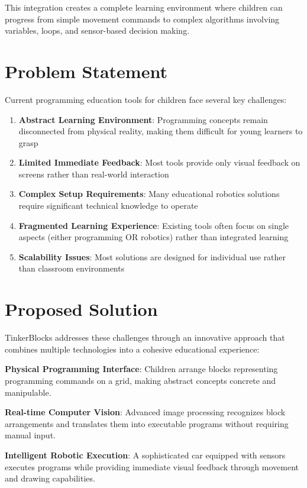 This integration creates a complete learning environment where children can progress from simple movement commands to complex algorithms involving variables, loops, and sensor-based decision making.

\section{Problem Statement}

Current programming education tools for children face several key challenges:

\begin{enumerate}
    \item \textbf{Abstract Learning Environment}: Programming concepts remain disconnected from physical reality, making them difficult for young learners to grasp
    \item \textbf{Limited Immediate Feedback}: Most tools provide only visual feedback on screens rather than real-world interaction
    \item \textbf{Complex Setup Requirements}: Many educational robotics solutions require significant technical knowledge to operate
    \item \textbf{Fragmented Learning Experience}: Existing tools often focus on single aspects (either programming OR robotics) rather than integrated learning
    \item \textbf{Scalability Issues}: Most solutions are designed for individual use rather than classroom environments
\end{enumerate}

\section{Proposed Solution}

TinkerBlocks addresses these challenges through an innovative approach that combines multiple technologies into a cohesive educational experience:

\textbf{Physical Programming Interface}: Children arrange blocks representing programming commands on a grid, making abstract concepts concrete and manipulable.

\textbf{Real-time Computer Vision}: Advanced image processing recognizes block arrangements and translates them into executable programs without requiring manual input.

\textbf{Intelligent Robotic Execution}: A sophisticated car equipped with sensors executes programs while providing immediate visual feedback through movement and drawing capabilities.


